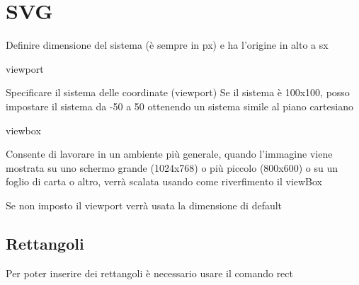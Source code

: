 \section{SVG}

Definire dimensione del sistema (è sempre in px) e ha l'origine in alto a sx

viewport

Specificare il sistema delle coordinate (viewport)
Se il sistema è 100x100, posso impostare il sistema da -50 a 50 ottenendo un sistema simile al piano cartesiano

viewbox

Consente di lavorare in un ambiente più generale, quando l'immagine viene mostrata su uno schermo grande (1024x768) o più piccolo (800x600) o su un foglio di carta o altro, verrà scalata usando come riverfimento il viewBox

Se non imposto il viewport verrà usata la dimensione di default



\subsection{Rettangoli}
Per poter inserire dei rettangoli è necessario usare il comando rect
